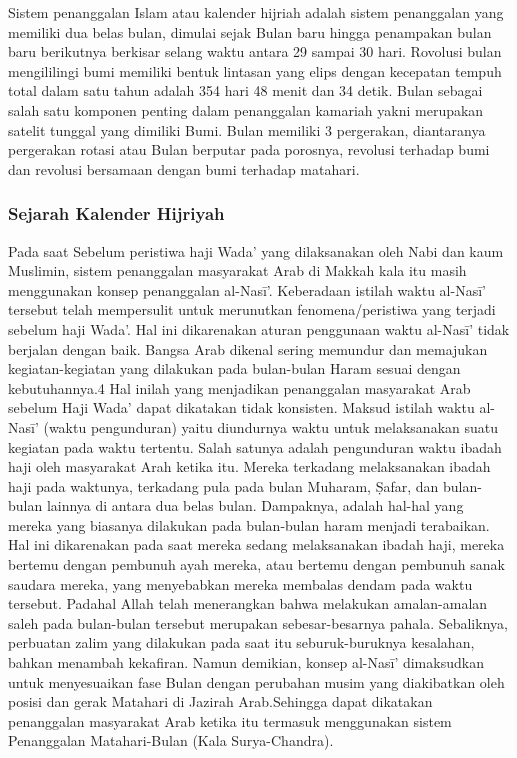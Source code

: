  Sistem penanggalan Islam atau kalender hijriah adalah sistem penanggalan yang memiliki dua belas bulan, dimulai sejak Bulan baru hingga penampakan bulan baru berikutnya berkisar selang waktu antara 29 sampai 30 hari. Rovolusi bulan mengililingi bumi memiliki bentuk lintasan yang elips dengan kecepatan tempuh total dalam satu tahun adalah 354 hari 48 menit dan 34 detik.
  Bulan sebagai salah satu komponen penting dalam penanggalan kamariah yakni merupakan satelit tunggal yang dimiliki Bumi. Bulan memiliki 3 pergerakan, diantaranya pergerakan rotasi atau Bulan berputar pada porosnya, revolusi terhadap bumi dan revolusi bersamaan dengan bumi terhadap matahari.

    \subsubsection{Sejarah Kalender Hijriyah}\cite{setyanto2015kriteria}
      Pada saat Sebelum peristiwa haji Wada’ yang dilaksanakan oleh Nabi dan kaum Muslimin, sistem penanggalan masyarakat Arab di Makkah kala itu masih menggunakan konsep penanggalan al-Nasī’. Keberadaan istilah waktu al-Nasī’ tersebut telah mempersulit untuk merunutkan fenomena/peristiwa yang terjadi sebelum haji Wada’.
    Hal ini dikarenakan aturan penggunaan waktu al-Nasī’ tidak berjalan dengan baik. Bangsa Arab dikenal sering memundur dan memajukan kegiatan-kegiatan yang dilakukan pada bulan-bulan Haram sesuai dengan kebutuhannya.4 Hal inilah yang menjadikan penanggalan masyarakat Arab sebelum Haji Wada’ dapat dikatakan tidak konsisten.
    Maksud istilah waktu al-Nasī’ (waktu pengunduran) yaitu diundurnya waktu untuk melaksanakan suatu kegiatan pada waktu tertentu. Salah satunya adalah pengunduran waktu ibadah haji oleh masyarakat Arah ketika itu. Mereka terkadang melaksanakan ibadah haji pada waktunya, terkadang pula pada bulan Muharam, Ṣafar, dan bulan-bulan lainnya di antara dua belas bulan.
    Dampaknya, adalah hal-hal yang mereka yang biasanya dilakukan pada bulan-bulan haram menjadi terabaikan. Hal ini dikarenakan pada saat mereka sedang melaksanakan ibadah haji, mereka bertemu dengan pembunuh ayah mereka, atau bertemu dengan pembunuh sanak saudara mereka, yang menyebabkan mereka membalas dendam pada waktu tersebut.
    Padahal Allah telah menerangkan bahwa melakukan amalan-amalan saleh pada bulan-bulan tersebut merupakan sebesar-besarnya pahala. Sebaliknya, perbuatan zalim yang dilakukan pada saat itu seburuk-buruknya kesalahan, bahkan menambah kekafiran.
    Namun demikian, konsep al-Nasī’ dimaksudkan untuk menyesuaikan fase Bulan dengan perubahan musim yang diakibatkan oleh posisi dan gerak Matahari di Jazirah Arab.Sehingga dapat dikatakan penanggalan masyarakat Arab ketika itu termasuk menggunakan sistem Penanggalan Matahari-Bulan (Kala Surya-Chandra).
